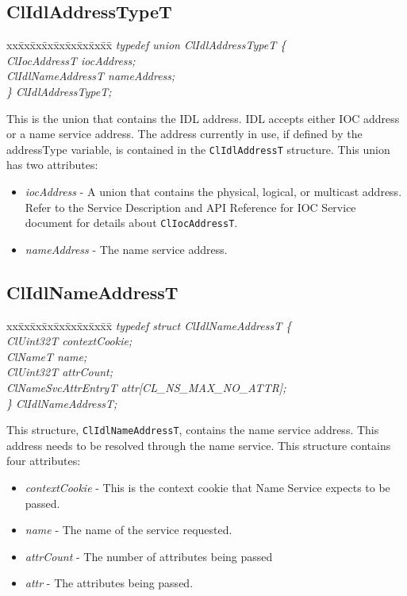 \begin{flushleft}
\subsection{ClIdlAddressTypeT}
\begin{tabbing}
xx\=xx\=xx\=xx\=xx\=xx\=xx\=xx\=xx\=\kill
\textit{typedef union ClIdlAddressTypeT \{}\\
\>\>\>\>\textit{ClIocAddressT           iocAddress;}\\
\>\>\>\>\textit{ClIdlNameAddressT  nameAddress;}\\
\textit{\} ClIdlAddressTypeT;} \end{tabbing}
This is the union that contains the IDL address. IDL accepts either IOC address or a name service address. The address currently in use, if defined by the addressType 
variable, is contained in the {\tt{ClIdlAddressT}} structure. This union has two attributes:
\begin{itemize}
\item
\textit{iocAddress} - A union that contains the physical, logical, or multicast address. Refer to the Service Description and API Reference for IOC Service 
document for details about {\tt{ClIocAddressT}}.
\item
\textit{nameAddress} - The name service address. 
 \end{itemize}


\subsection{ClIdlNameAddressT}
\begin{tabbing}
xx\=xx\=xx\=xx\=xx\=xx\=xx\=xx\=xx\=\kill
\textit{typedef struct ClIdlNameAddressT \{}\\
\>\>\>\>\textit{ClUint32T contextCookie;}\\
\>\>\>\>\textit{ClNameT name;}\\
\>\>\>\>\textit{ClUint32T attrCount;}\\
\>\>\>\>\textit{ClNameSvcAttrEntryT   attr[CL\_NS\_MAX\_NO\_ATTR];}\\
\textit{\} ClIdlNameAddressT;} \end{tabbing}
This structure, {\tt{ClIdlNameAddressT}}, contains the name service address. This address needs to be resolved through the name service. This structure contains four attributes:
\begin{itemize}
\item
\textit{contextCookie} - This is the context cookie that Name Service expects to be passed.
\item
\textit{name} - The name of the service requested.
\item
\textit{attrCount} - The number of attributes being passed
\item
\textit{attr} - The attributes being passed.
 \end{itemize}



\end{flushleft}
